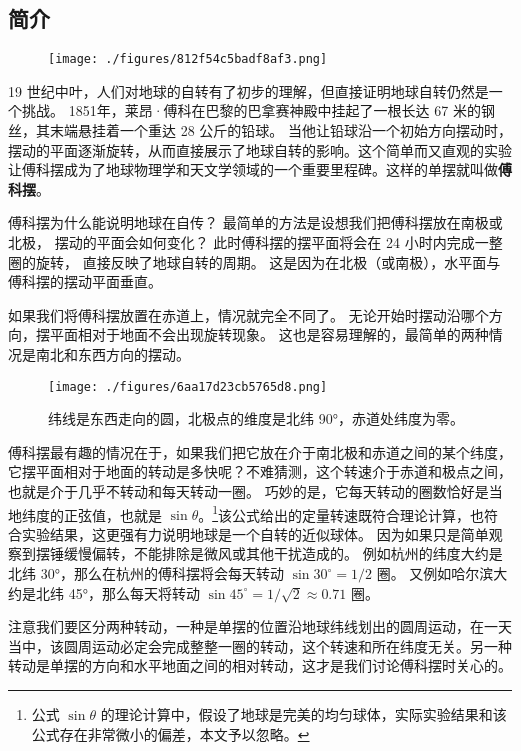 
\subsection{简介}

\begin{figure}[ht]
\centering
\texttt{[image: ./figures/812f54c5badf8af3.png]}
\caption{} \label{fig_FouPen_1}
\end{figure}

19 世纪中叶，人们对地球的自转有了初步的理解，但直接证明地球自转仍然是一个挑战。 1851年，莱昂·傅科在巴黎的巴拿赛神殿中挂起了一根长达 67 米的钢丝，其末端悬挂着一个重达 28 公斤的铅球。 当他让铅球沿一个初始方向摆动时，摆动的平面逐渐旋转，从而直接展示了地球自转的影响。这个简单而又直观的实验让傅科摆成为了地球物理学和天文学领域的一个重要里程碑。这样的单摆就叫做\textbf{傅科摆}。

傅科摆为什么能说明地球在自传？ 最简单的方法是设想我们把傅科摆放在南极或北极， 摆动的平面会如何变化？ 此时傅科摆的摆平面将会在 24 小时内完成一整圈的旋转， 直接反映了地球自转的周期。 这是因为在北极（或南极），水平面与傅科摆的摆动平面垂直。

如果我们将傅科摆放置在赤道上，情况就完全不同了。 无论开始时摆动沿哪个方向，摆平面相对于地面不会出现旋转现象。 这也是容易理解的，最简单的两种情况是南北和东西方向的摆动。

\begin{figure}[ht]
\centering
\texttt{[image: ./figures/6aa17d23cb5765d8.png]}
\caption{纬线是东西走向的圆，北极点的维度是北纬 90°，赤道处纬度为零。} \label{fig_FouPen_3}
\end{figure}


傅科摆最有趣的情况在于，如果我们把它放在介于南北极和赤道之间的某个纬度，它摆平面相对于地面的转动是多快呢？不难猜测，这个转速介于赤道和极点之间，也就是介于几乎不转动和每天转动一圈。 巧妙的是，它每天转动的圈数恰好是当地纬度的正弦值，也就是 $\sin\theta$。\footnote{公式 $\sin\theta$ 的理论计算中，假设了地球是完美的均匀球体，实际实验结果和该公式存在非常微小的偏差，本文予以忽略。}该公式给出的定量转速既符合理论计算，也符合实验结果，这更强有力说明地球是一个自转的近似球体。 因为如果只是简单观察到摆锤缓慢偏转，不能排除是微风或其他干扰造成的。 例如杭州的纬度大约是北纬 30°，那么在杭州的傅科摆将会每天转动 $\sin 30^\circ = 1/2$ 圈。 又例如哈尔滨大约是北纬 45°，那么每天将转动 $\sin 45^\circ = 1/\sqrt{2}\approx 0.71$ 圈。

注意我们要区分两种转动，一种是单摆的位置沿地球纬线划出的圆周运动，在一天当中，该圆周运动必定会完成整整一圈的转动，这个转速和所在纬度无关。另一种转动是单摆的方向和水平地面之间的相对转动，这才是我们讨论傅科摆时关心的。

